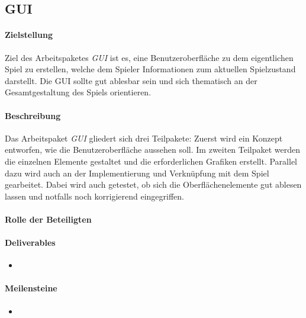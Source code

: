 \subsection{GUI}

\paragraph{Zielstellung}\noindent
Ziel des Arbeitspaketes \textit{GUI} ist es, eine Benutzeroberfläche zu dem eigentlichen Spiel zu erstellen, welche dem Spieler Informationen zum aktuellen Spielzustand darstellt. Die GUI sollte gut ablesbar sein und sich thematisch an der Gesamtgestaltung des Spiels orientieren.

\paragraph{Beschreibung}\noindent
Das Arbeitspaket \textit{GUI} gliedert sich drei Teilpakete: Zuerst wird ein Konzept entworfen, wie die Benutzeroberfläche aussehen soll. Im zweiten Teilpaket werden die einzelnen Elemente gestaltet und die erforderlichen Grafiken erstellt. Parallel dazu wird auch an der Implementierung und Verknüpfung mit dem Spiel gearbeitet. Dabei wird auch getestet, ob sich die Oberflächenelemente gut ablesen lassen und notfalls noch korrigierend eingegriffen.

\paragraph{Rolle der Beteiligten}\noindent


\paragraph{Deliverables}\noindent
\begin{itemize}
\item 
\end{itemize}

\paragraph{Meilensteine}\noindent
\begin{itemize}
\item 
\end{itemize}